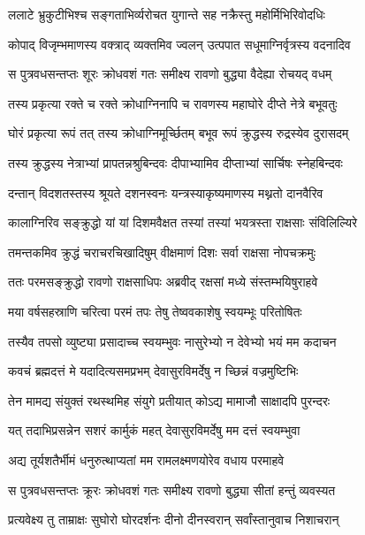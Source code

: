 \twolineshloka
{ललाटे भ्रुकुटीभिश्च सङ्गताभिर्व्यरोचत}
{युगान्ते सह नक्रैस्तु महोर्मिभिरिवोदधिः} %

\twolineshloka
{कोपाद् विजृम्भमाणस्य वक्त्राद् व्यक्तमिव ज्वलन्}
{उत्पपात सधूमाग्निर्वृत्रस्य वदनादिव} %

\twolineshloka
{स पुत्रवधसन्तप्तः शूरः क्रोधवशं गतः}
{समीक्ष्य रावणो बुद्ध्या वैदेह्या रोचयद् वधम्} %

\twolineshloka
{तस्य प्रकृत्या रक्ते च रक्ते क्रोधाग्निनापि च}
{रावणस्य महाघोरे दीप्ते नेत्रे बभूवतुः} %

\twolineshloka
{घोरं प्रकृत्या रूपं तत् तस्य क्रोधाग्निमूर्च्छितम्}
{बभूव रूपं क्रुद्धस्य रुद्रस्येव दुरासदम्} %

\twolineshloka
{तस्य क्रुद्धस्य नेत्राभ्यां प्रापतन्नश्रुबिन्दवः}
{दीपाभ्यामिव दीप्ताभ्यां सार्चिषः स्नेहबिन्दवः} %

\twolineshloka
{दन्तान् विदशतस्तस्य श्रूयते दशनस्वनः}
{यन्त्रस्याकृष्यमाणस्य मथ्नतो दानवैरिव} %

\twolineshloka
{कालाग्निरिव सङ्क्रुद्धो यां यां दिशमवैक्षत}
{तस्यां तस्यां भयत्रस्ता राक्षसाः संविलिल्यिरे} %

\twolineshloka
{तमन्तकमिव क्रुद्धं चराचरचिखादिषुम्}
{वीक्षमाणं दिशः सर्वा राक्षसा नोपचक्रमुः} %

\twolineshloka
{ततः परमसङ्क्रुद्धो रावणो राक्षसाधिपः}
{अब्रवीद् रक्षसां मध्ये संस्तम्भयिषुराहवे} %

\twolineshloka
{मया वर्षसहस्राणि चरित्वा परमं तपः}
{तेषु तेष्ववकाशेषु स्वयम्भूः परितोषितः} %

\twolineshloka
{तस्यैव तपसो व्युष्ट्या प्रसादाच्च स्वयम्भुवः}
{नासुरेभ्यो न देवेभ्यो भयं मम कदाचन} %

\twolineshloka
{कवचं ब्रह्मदत्तं मे यदादित्यसमप्रभम्}
{देवासुरविमर्देषु न च्छिन्नं वज्रमुष्टिभिः} %

\twolineshloka
{तेन मामद्य संयुक्तं रथस्थमिह संयुगे}
{प्रतीयात् कोऽद्य मामाजौ साक्षादपि पुरन्दरः} %

\twolineshloka
{यत् तदाभिप्रसन्नेन सशरं कार्मुकं महत्}
{देवासुरविमर्देषु मम दत्तं स्वयम्भुवा} %

\twolineshloka
{अद्य तूर्यशतैर्भीमं धनुरुत्थाप्यतां मम}
{रामलक्ष्मणयोरेव वधाय परमाहवे} %

\twolineshloka
{स पुत्रवधसन्तप्तः क्रूरः क्रोधवशं गतः}
{समीक्ष्य रावणो बुद्ध्या सीतां हन्तुं व्यवस्यत} %

\twolineshloka
{प्रत्यवेक्ष्य तु ताम्राक्षः सुघोरो घोरदर्शनः}
{दीनो दीनस्वरान् सर्वांस्तानुवाच निशाचरान्} %

